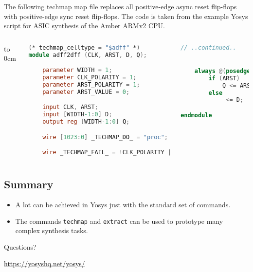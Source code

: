 \begin{frame}[t, fragile]{\subsubsecname}
The following techmap map file replaces all positive-edge async reset flip-flops with
positive-edge sync reset flip-flops. The code is taken from the example Yosys script
for ASIC synthesis of the Amber ARMv2 CPU.

\begin{columns}
\column[t]{6cm}
\vbox to 0cm{
\begin{lstlisting}[basicstyle=\ttfamily\fontsize{8pt}{10pt}\selectfont, language=Verilog]
(* techmap_celltype = "$adff" *)
module adff2dff (CLK, ARST, D, Q);

    parameter WIDTH = 1;
    parameter CLK_POLARITY = 1;
    parameter ARST_POLARITY = 1;
    parameter ARST_VALUE = 0;

    input CLK, ARST;
    input [WIDTH-1:0] D;
    output reg [WIDTH-1:0] Q;

    wire [1023:0] _TECHMAP_DO_ = "proc";

    wire _TECHMAP_FAIL_ = !CLK_POLARITY || !ARST_POLARITY;
\end{lstlisting}
\vss}
\column[t]{4cm}
\begin{lstlisting}[basicstyle=\ttfamily\fontsize{8pt}{10pt}\selectfont, language=Verilog]
// ..continued..


    always @(posedge CLK)
        if (ARST)
            Q <= ARST_VALUE;
        else
             <= D;

endmodule
\end{lstlisting}
\end{columns}

\end{frame}


\subsection{Summary}

\begin{frame}{\subsecname}
\begin{itemize}
\item A lot can be achieved in Yosys just with the standard set of commands.
\item The commands {\tt techmap} and {\tt extract} can be used to prototype many complex synthesis tasks.
\end{itemize}

\bigskip
\bigskip
\begin{center}
Questions?
\end{center}

\bigskip
\bigskip
\begin{center}
\url{https://yosyshq.net/yosys/}
\end{center}
\end{frame}

